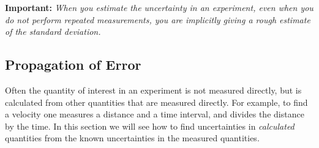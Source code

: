 {\bf Important:}  {\em When you estimate the uncertainty in an experiment,
even when you do not perform repeated measurements, you are
implicitly giving a rough estimate of the standard deviation.}

\subsection*{Propagation of Error}
     Often the quantity of interest in an experiment is not
measured directly, but is calculated from other quantities that
are measured directly.  For example, to find a velocity one
measures a distance and a time interval, and divides the distance by
the
time.  In this section we will see how to find uncertainties in
{\em calculated} quantities from the known uncertainties in the
measured quantities.



